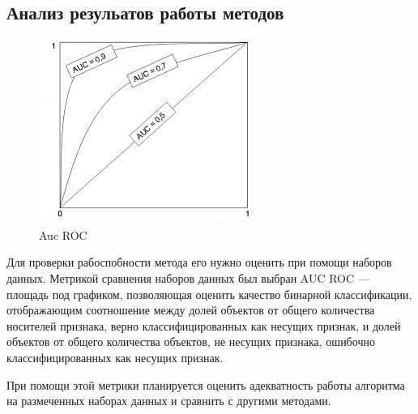 \subsection{Анализ резульатов работы методов}
\begin{figure}[!h]
	\centering
	\includegraphics[width=.5\textwidth]{img/aucROc.png}
	\caption{Auc ROC}
	\label{fig06}
\end{figure}
Для проверки рабоспобности метода его нужно оценить при помощи наборов данных. Метрикой сравнения наборов данных был выбран AUC ROC — площадь под графиком, позволяющая оценить качество бинарной классификации, отображающим соотношение между долей объектов от общего количества носителей признака, верно классифицированных как несущих признак, и долей объектов от общего количества объектов, не несущих признака, ошибочно классифицированных как несущих признак. 

При помощи этой метрики планируется оценить адекватность работы алгоритма на размеченных наборах данных и  сравнить  с другими методами.
